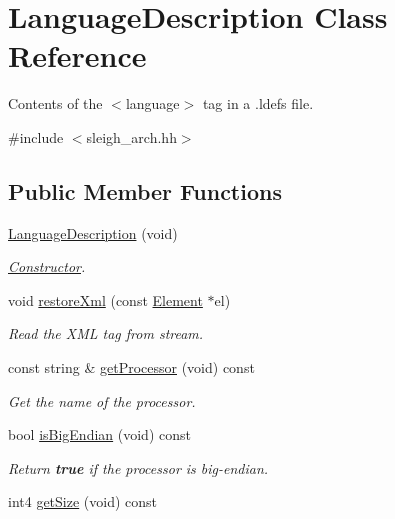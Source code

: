 \hypertarget{class_language_description}{}\section{Language\+Description Class Reference}
\label{class_language_description}


Contents of the $<$language$>$ tag in a .ldefs file.  




{\ttfamily \#include $<$sleigh\+\_\+arch.\+hh$>$}

\subsection*{Public Member Functions}
\begin{DoxyCompactItemize}
\item 
\mbox{\hyperlink{class_language_description_aa2b83b431a0270ee0381f9bde5b8fb30}{Language\+Description}} (void)
\begin{DoxyCompactList}\small\item\em \mbox{\hyperlink{class_constructor}{Constructor}}. \end{DoxyCompactList}\item 
void \mbox{\hyperlink{class_language_description_a4bbedcd8baa147052ac4e9a01952e96e}{restore\+Xml}} (const \mbox{\hyperlink{class_element}{Element}} $\ast$el)
\begin{DoxyCompactList}\small\item\em Read the X\+ML tag from stream. \end{DoxyCompactList}\item 
const string \& \mbox{\hyperlink{class_language_description_ac503b8d360dc19de6e27bf3d887404a7}{get\+Processor}} (void) const
\begin{DoxyCompactList}\small\item\em Get the name of the processor. \end{DoxyCompactList}\item 
bool \mbox{\hyperlink{class_language_description_a80a70fcdeb1c63c3d3a55a65a3fa97ca}{is\+Big\+Endian}} (void) const
\begin{DoxyCompactList}\small\item\em Return {\bfseries{true}} if the processor is big-\/endian. \end{DoxyCompactList}\item 
int4 \mbox{\hyperlink{class_language_description_ac90031c474494dae6c1cdd8803ac265c}{get\+Size}} (void) const

\end{DoxyCompactItemize}
